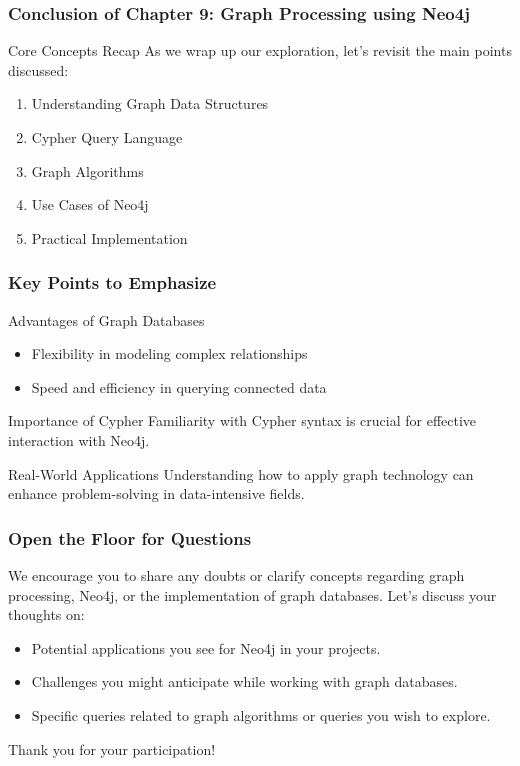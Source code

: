 \documentclass[aspectratio=169]{beamer}
\begin{document}
\begin{frame}[fragile]
    \frametitle{Conclusion of Chapter 9: Graph Processing using Neo4j}
    \begin{block}{Core Concepts Recap}
        As we wrap up our exploration, let's revisit the main points discussed:
        \begin{enumerate}
            \item Understanding Graph Data Structures
            \item Cypher Query Language
            \item Graph Algorithms
            \item Use Cases of Neo4j
            \item Practical Implementation
        \end{enumerate}
    \end{block}
\end{frame}

\begin{frame}[fragile]
    \frametitle{Key Points to Emphasize}
    \begin{block}{Advantages of Graph Databases}
        \begin{itemize}
            \item Flexibility in modeling complex relationships
            \item Speed and efficiency in querying connected data
        \end{itemize}
    \end{block}
    \begin{block}{Importance of Cypher}
        Familiarity with Cypher syntax is crucial for effective interaction with Neo4j.
    \end{block}
    \begin{block}{Real-World Applications}
        Understanding how to apply graph technology can enhance problem-solving in data-intensive fields.
    \end{block}
\end{frame}

\begin{frame}[fragile]
    \frametitle{Open the Floor for Questions}
    We encourage you to share any doubts or clarify concepts regarding graph processing, Neo4j, or the implementation of graph databases. Let's discuss your thoughts on:
    \begin{itemize}
        \item Potential applications you see for Neo4j in your projects.
        \item Challenges you might anticipate while working with graph databases.
        \item Specific queries related to graph algorithms or queries you wish to explore.
    \end{itemize}
    Thank you for your participation!
\end{frame}
\end{document}

